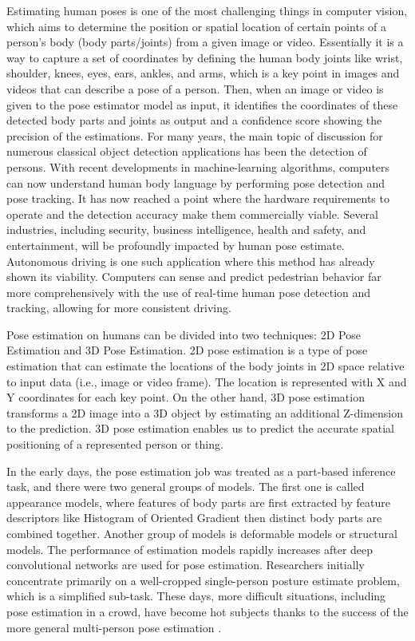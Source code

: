 Estimating human poses is one of the most challenging things in computer vision, which aims to determine the position or spatial location of certain points of a person's body (body parts/joints) from a given image or video.
Essentially it is a way to capture a set of coordinates by defining the human body joints like wrist, shoulder, knees, eyes, ears, ankles, and arms, which is a key point in images and videos that can describe a pose of a person. Then, when an image or video is given to the pose estimator model as input, it identifies the coordinates of these detected body parts and joints as output and a confidence score showing the precision of the estimations.
For many years, the main topic of discussion for numerous classical object detection applications has been the detection of persons.
With recent developments in machine-learning algorithms, computers can now understand human body language by performing pose detection and pose tracking. It has now reached a point where the hardware requirements to operate and the detection accuracy make them commercially viable.
Several industries, including security, business intelligence, health and safety, and entertainment, will be profoundly impacted by human pose estimate. Autonomous driving is one such application where this method has already shown its viability. Computers can sense and predict pedestrian behavior far more comprehensively with the use of real-time human pose detection and tracking, allowing for more consistent driving.

Pose estimation on humans can be divided into two techniques: 2D Pose Estimation and 3D Pose Estimation.
2D pose estimation is a type of pose estimation that can estimate the locations of the body joints in 2D space relative to input data (i.e., image or video frame). The location is represented with X and Y coordinates for each key point. On the other hand, 3D pose estimation transforms a 2D image into a 3D object by estimating an additional Z-dimension to the prediction. 3D pose estimation enables us to predict the accurate spatial positioning of a represented person or thing.

In the early days, the pose estimation job was treated as a part-based inference task, and there were two general groups of models. The first one is called appearance models, where features of body parts are first extracted by feature descriptors like Histogram of Oriented Gradient then distinct body parts are combined together.
Another group of models is deformable models or structural models. 
The performance of estimation models rapidly increases after deep convolutional networks are used for pose estimation. Researchers initially concentrate primarily on a well-cropped single-person posture estimate problem, which is a simplified sub-task. These days, more difficult situations, including pose estimation in a crowd, have become hot subjects thanks to the success of the more general multi-person pose estimation \parencite{song2021}.

